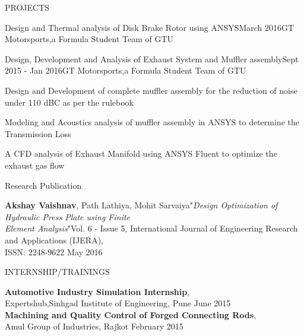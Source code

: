 \documentclass{resume} %
\begin{document}
\begin{rSection}{PROJECTS}
\begin{rSubsection}{Design and Thermal analysis of Disk Brake Rotor using ANSYS}{March 2016}{GT Motorsports,a Formula Student Team of GTU}{}
\end{rSubsection}


\begin{rSubsection}{Design, Development and Analysis of Exhaust System and  Muffler assembly}{Sept 2015 - Jan 2016}{GT Motorsports,a Formula Student Team of GTU}{}    

\item Design and Development of complete muffler assembly for the reduction of noise under 110 dBC as per the rulebook        
\item Modeling and Acoustics analysis of muffler assembly in ANSYS to determine the  Transmission Loss
\item A CFD analysis of Exhaust Manifold using ANSYS Fluent to optimize the exhaust gas flow

\end{rSubsection} 

\end{rSection} 

\begin{rSection}{ Research Publication } \itemsep -3pt        

{\textbf{Akshay Vaishnav}, Path Lathiya, Mohit Sarvaiya"\textit{Design Optimization of Hydraulic Press Plate using Finite \\Element Analysis}"Vol. 6 - Issue 5, International Journal of Engineering Research and Applications (IJERA), \\ISSN: 2248-9622 } \hfill May 2016 \\    
 
\end{rSection}



\begin{rSection}{INTERNSHIP/TRAININGS} \itemsep -3pt  

{\textbf{Automotive Industry Simulation Internship}, \\Expertshub,Sinhgad Institute of Engineering, Pune } \hfill June 2015 \\   
{\textbf{Machining and Quality Control of Forged Connecting Rods}, \\Amul Group of Industries, Rajkot} \hfill February 2015 \\     

\end{rSection}  
 
\end{document}
